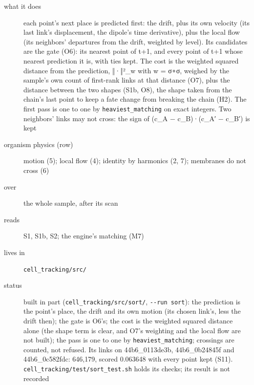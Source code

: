 \begin{description}
\item[{what it does}] each point's next place is predicted first: the drift, plus its own velocity (its last link's displacement, the dipole's time derivative), plus the local flow (its neighbors' departures from the drift, weighted by level). Its candidates are the gate (O6): its nearest point of t+1, and every point of t+1 whose nearest prediction it is, with ties kept. The cost is the weighted squared distance from the prediction, ‖·‖²\_\allowbreak{}w with w = σ∘σ, weighed by the sample's own count of first-rank links at that distance (O7), plus the distance between the two shapes (S1b, O8), the shape taken from the chain's last point to keep a fate change from breaking the chain (H2). The first pass is one to one by \texttt{heaviest\_\allowbreak{}matching} on exact integers. Two neighbors' links may not cross: the sign of (c\_\allowbreak{}A − c\_\allowbreak{}B)·(c\_\allowbreak{}A′ − c\_\allowbreak{}B′) is kept
\item[{organism physics (row)}] motion (5); local flow (4); identity by harmonics (2, 7); membranes do not cross (6)
\item[{over}] the whole sample, after its scan
\item[{reads}] S1, S1b, S2; the engine's matching (M7)
\item[{lives in}] \texttt{cell\_\allowbreak{}tracking/\allowbreak{}src/\allowbreak{}}
\item[{status}] built in part (\texttt{cell\_\allowbreak{}tracking/\allowbreak{}src/\allowbreak{}sort/\allowbreak{}}, \texttt{-\allowbreak{}-\allowbreak{}run sort}): the prediction is the point's place, the drift and its own motion (its chosen link's, less the drift then); the gate is O6's; the cost is the weighted squared distance alone (the shape term is clear, and O7's weighting and the local flow are not built); the pass is one to one by \texttt{heaviest\_\allowbreak{}matching}; crossings are counted, not refused. Its links on 44b6\_\allowbreak{}0113de3b, 44b6\_\allowbreak{}0b24845f and 44b6\_\allowbreak{}0c582fdc: 646,179, scored 0.063648 with every point kept (S11). \texttt{cell\_\allowbreak{}tracking/\allowbreak{}test/\allowbreak{}sort\_\allowbreak{}test.\allowbreak{}sh} holds its checks; its result is not recorded
\end{description}

